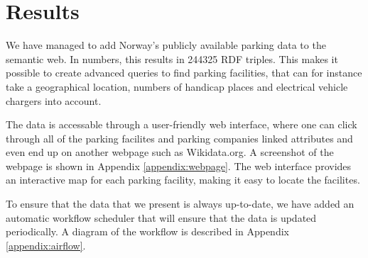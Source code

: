 \chapter{Results}
We have managed to add Norway's publicly available parking data to the semantic web. In numbers, this results in 244325 RDF triples. This makes it possible to create advanced queries to find parking facilities, that can for instance take a geographical location, numbers of handicap places and electrical vehicle chargers into account.

The data is accessable through a user-friendly web interface, where one can click through all of the parking facilites and parking companies linked attributes and even end up on another webpage such as Wikidata.org. A screenshot of the webpage is shown in Appendix \ref{appendix:webpage}. The web interface provides an interactive map for each parking facility, making it easy to locate the facilites.

To ensure that the data that we present is always up-to-date, we have added an automatic workflow scheduler that will ensure that the data is updated periodically. A diagram of the workflow is described in Appendix \ref{appendix:airflow}.

